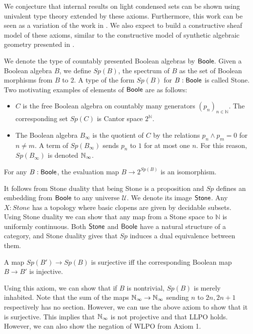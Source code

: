 \documentclass{../util/zariski}
\begin{document}
We conjecture that internal results on light condensed sets \cite{Dagur,Scholze,Condensed} can be shown using univalent
type theory extended by these axioms.
Furthermore, this work can be seen as a variation of the work in \cite{XuE13}. We also expect to build a constructive
sheaf model of these axioms, similar to the constructive model of synthetic algebraic geometry presented in \cite{draft}.

\medskip

We denote the type of countably presented Boolean algebras by $\mathsf{Boole}$.
Given a Boolean algebra $B$, we define $Sp(B)$, the spectrum of $B$ as the set of Boolean morphisms from $B$ to $2$.  
A type of the form $Sp(B)$ for $B:\mathsf{Boole}$ is called Stone.
%
Two motivating examples of elements of $\mathsf{Boole}$ are as follows:
 \begin{itemize}
   \item $C$ is the free Boolean algebra on countably many generators $(p_n)_{n\in\mathbb N}$. 
     The corresponding set $Sp(C)$ is Cantor space $2^\mathbb N$. 
   \item 
     The Boolean algebra $ B_\infty$ is %
     the quotient of $C$ by the relations $p_n\wedge p_m = 0$ for $n\neq m$.  
     A term of $Sp(B_\infty)$ sends $p_n$ to $1$ for at most one $n$. 
     For this reason, $Sp(B_\infty)$ is denoted $\mathbb{N}_{\infty}$. 
  \end{itemize} 

\begin{axiom}
  For any 
  $B:\mathsf{Boole}$, 
  the evaluation map $B \to 2^{Sp(B)}$ is an isomorphism. 
\end{axiom}
It follows from Stone duality that being Stone is a proposition and $Sp$ defines an embedding from $\mathsf{Boole}$ 
to any universe $\mathcal U$. We denote its image $\mathsf{Stone}$. 
Any $X:Stone$ has a topology where basic clopens are given by decidable subsets. 
Using Stone duality we can show that any map from a Stone space to $\mathbb N$ is uniformly continuous. 
Both $\mathsf{Stone}$ and $\mathsf{Boole}$ have a natural structure of a category, and 
Stone duality gives that $Sp$ induces a dual equivalence between them. 

\begin{axiom}
  A map $Sp(B')\to Sp(B)$ is surjective iff the corresponding Boolean map $B \to B'$ is injective.
\end{axiom} 
Using this axiom, we can show that if $B$ is nontrivial, $Sp(B)$ is merely inhabited.
%
%
Note that the sum of the maps $\mathbb{N}_{\infty} \to \mathbb{N}_{\infty}$ sending $n$ to $2n,2n+1$ respectively has no section. 
However, we can use the above axiom to show that it is surjective. 
This implies that $\mathbb{N}_{\infty}$ is not projective and that LLPO holds. 
However, we can also show the negation of WLPO from Axiom 1.  
\end{document}
